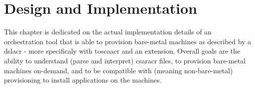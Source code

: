 \chapter{Design and Implementation} %



This chapter is dedicated on the actual implementation details of an orchestration tool that is able to provision bare-metal machines as described by a \gls{dslacr} - more specificaly with \gls{toscaacr} and an extension.
\newline
Overall goals are the ability to understand (parse and interpret) \gls{csaracr} files, to provision bare-metal machines on-demand, and to be compatible with  (meaning non-bare-metal) provisioning to install applications on the machines.


